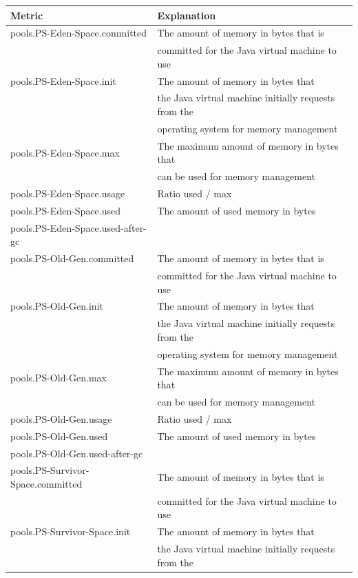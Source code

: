 \documentclass{seal_thesis}
\begin{document}
\begin{table}[ht]
\centering
\begin{tabular}{|l|l|}
\hline
\textbf{Metric} & \textbf{Explanation} \\ \hline
pools.PS-Eden-Space.committed & The amount of memory in bytes that is \\
								& committed for the Java virtual machine to use \\ \hline
pools.PS-Eden-Space.init & The amount of memory in bytes that \\
							& the Java virtual machine initially requests from the \\
							& operating system for memory management \\ \hline
pools.PS-Eden-Space.max & The maximum amount of memory in bytes that \\
						& can be used for memory management \\ \hline
pools.PS-Eden-Space.usage & Ratio used / max \\ \hline
pools.PS-Eden-Space.used & The amount of used memory in bytes \\ \hline
pools.PS-Eden-Space.used-after-gc & \\ \hline
pools.PS-Old-Gen.committed & The amount of memory in bytes that is \\
							& committed for the Java virtual machine to use \\ \hline
pools.PS-Old-Gen.init & The amount of memory in bytes that \\
						& the Java virtual machine initially requests from the \\
						& operating system for memory management \\ \hline
pools.PS-Old-Gen.max & The maximum amount of memory in bytes that \\
						& can be used for memory management \\ \hline
pools.PS-Old-Gen.usage & Ratio used / max \\ \hline
pools.PS-Old-Gen.used & The amount of used memory in bytes \\ \hline
pools.PS-Old-Gen.used-after-gc & \\ \hline
pools.PS-Survivor-Space.committed & The amount of memory in bytes that is \\
									& committed for the Java virtual machine to use \\ \hline
pools.PS-Survivor-Space.init & The amount of memory in bytes that \\
							& the Java virtual machine initially requests from the \\

\end{tabular}
\end{table}
\end{document}
